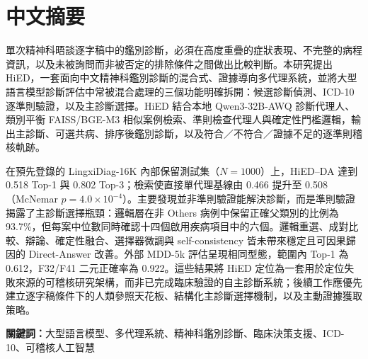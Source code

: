 
\chapter*{中文摘要}
單次精神科晤談逐字稿中的鑑別診斷，必須在高度重疊的症狀表現、不完整的病程資訊，以及未被詢問而非被否定的排除條件之間做出比較判斷。本研究提出 HiED，一套面向中文精神科鑑別診斷的混合式、證據導向多代理系統，並將大型語言模型診斷評估中常被混合處理的三個功能明確拆開：候選診斷偵測、ICD-10 逐準則驗證，以及主診斷選擇。HiED 結合本地 Qwen3-32B-AWQ 診斷代理人、類別平衡 FAISS/BGE-M3 相似案例檢索、準則檢查代理人與確定性門檻邏輯，輸出主診斷、可選共病、排序後鑑別診斷，以及符合／不符合／證據不足的逐準則稽核軌跡。

在預先登錄的 LingxiDiag-16K 內部保留測試集（$N=1000$）上，HiED--DA 達到 0.518 Top-1 與 0.802 Top-3；檢索使直接單代理基線由 0.466 提升至 0.508（McNemar $p=4.0\times10^{-4}$）。主要發現並非準則驗證能解決診斷，而是準則驗證揭露了主診斷選擇瓶頸：邏輯層在非 Others 病例中保留正確父類別的比例為 93.7\%，但每案中位數同時確認十四個啟用疾病項目中的六個。邏輯重選、成對比較、辯論、確定性融合、選擇器微調與 self-consistency 皆未帶來穩定且可因果歸因的 Direct-Answer 改善。外部 MDD-5k 評估呈現相同型態，範圍內 Top-1 為 0.612，F32/F41 二元正確率為 0.922。這些結果將 HiED 定位為一套用於定位失敗來源的可稽核研究架構，而非已完成臨床驗證的自主診斷系統；後續工作應優先建立逐字稿條件下的人類參照天花板、結構化主診斷選擇機制，以及主動證據獲取策略。

\noindent\textbf{關鍵詞：}大型語言模型、多代理系統、精神科鑑別診斷、臨床決策支援、ICD-10、可稽核人工智慧
